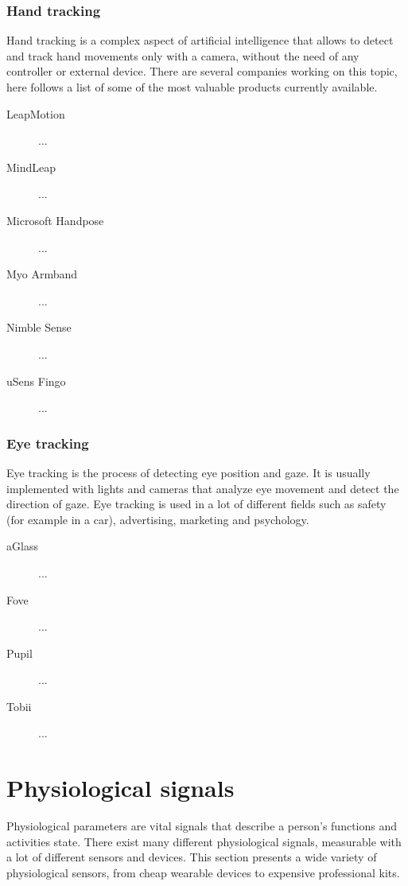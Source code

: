 \documentclass[binding=0.6cm,LaM]{sapthesis}
\begin{document}
\subsubsection{Hand tracking}
Hand tracking is a complex aspect of artificial intelligence that allows to detect and track hand movements only with a camera, without the need of any controller or external device. There are several companies working on this topic, here follows a list of some of the most valuable products currently available.

\begin{description}

\item[LeapMotion]
...

\item[MindLeap]
...

\item[Microsoft Handpose]
...

\item[Myo Armband]
...

\item[Nimble Sense]
...

\item[uSens Fingo]
...

\end{description}

\subsubsection{Eye tracking}
Eye tracking is the process of detecting eye position and gaze. It is usually implemented with lights and cameras that analyze eye movement and detect the direction of gaze. Eye tracking is used in a lot of different fields such as safety (for example in a car), advertising, marketing and psychology.


\begin{description}

\item[aGlass]
...

\item[Fove]
...

\item[Pupil]
...

\item[Tobii]
...

\end{description}

\section{Physiological signals}
Physiological parameters are vital signals that describe a person's functions and activities state. There exist many different physiological signals, measurable with a lot of different sensors and devices. This section presents a wide variety of physiological sensors, from cheap wearable devices to expensive professional kits.
\end{document}
